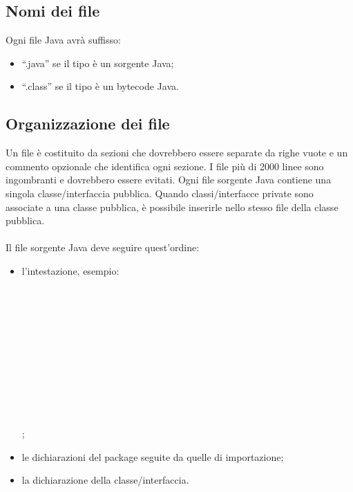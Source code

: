 \subsection{Nomi dei file}
Ogni file Java avr\`a suffisso:
\begin{itemize}
  \item ``.java'' se il tipo \`e un sorgente Java;
  \item ``.class'' se il tipo \`e un bytecode Java.
\end{itemize}

\subsection{Organizzazione dei file}
Un file \`e costituito da sezioni che dovrebbero essere separate da righe vuote
e un commento opzionale che identifica ogni sezione. I file pi\`u di 2000 linee sono
ingombranti e dovrebbero essere evitati.
Ogni file sorgente Java contiene una singola classe/interfaccia pubblica.
Quando classi/interfacce private sono associate a una classe pubblica,
\`e possibile inserirle nello stesso file della classe pubblica.
\\ \\
Il file sorgente Java deve seguire quest'ordine:
\begin{itemize}
  \item l'intestazione, esempio: \\
  \hspace*{0.5cm} \co{//} \\
  \hspace*{0.5cm}  \\
  \hspace*{0.5cm} \co{//} \\
  \hspace*{0.5cm}  \\
  \hspace*{0.5cm} \co{//} \\
  \hspace*{0.5cm}  \\
  \hspace*{0.5cm} \co{//} \\
  \hspace*{0.5cm}  \\
  \hspace*{0.5cm} \co{//} \\
  \hspace*{0.5cm}  \\
  \hspace*{0.5cm} \co{//} \\
  ;
  \item le dichiarazioni del package seguite da quelle di importazione;
  \item la dichiarazione della classe/interfaccia.
\end{itemize}

